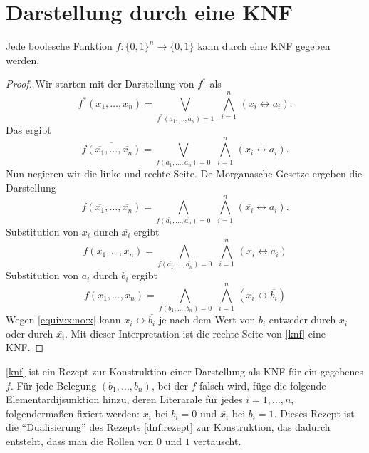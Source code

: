 \section{Darstellung durch eine KNF}

\begin{thm}
	Jede boolesche Funktion $f : \{0,1\}^n \to \{0,1\}$ kann durch eine KNF gegeben werden. 
\end{thm} 
\begin{proof}
		Wir starten mit der Darstellung von $f^\ast$ als 
		\[
			f^\ast(x_1,\ldots,x_n) = \bigvee_{f^\ast(a_1,\ldots,a_n)=1} \ \, \bigwedge_{i=1}^n \, (x_i \leftrightarrow a_i).
		\]
		Das ergibt 
		\[
			\overline{ f(\overline{x_1},\ldots,\overline{x_n})} = \bigvee_{f(\overline{a_1},\ldots,\overline{a_n}) = 0} \ \, \bigwedge_{i=1}^n  \, (x_i \leftrightarrow a_i). 
		\]
		Nun negieren wir die linke und rechte Seite. De Morganasche Gesetze ergeben die Darstellung 
		\[	
				f(\overline{x_1},\ldots,\overline{x_n}) = \bigwedge_{f(\overline{a_1},\ldots,\overline{a_n})=0} \ \, \bigwedge_{i=1}^n  \, (\overline{x_i} \leftrightarrow a_i). 
		\]
		Substitution von $x_i$ durch $\overline{x_i}$ ergibt 
		\[
				f(x_1,\ldots,x_n) = \bigwedge_{f(\overline{a_1},\ldots,\overline{a_n})=0} \ \, \bigwedge_{i=1}^n  \, (x_i \leftrightarrow a_i)
		\]
		Substitution von $a_i$ durch $\overline{b_i}$ ergibt
		\begin{equation} \label{knf} 
			f(x_1,\ldots,x_n) = \bigwedge_{f(b_1,\ldots,b_n)=0} \ \, \bigwedge_{i=1}^n  \, (x_i \leftrightarrow \overline{b_i})
		\end{equation}
		Wegen \eqref{equiv:x:no:x} kann $x_i \leftrightarrow \overline{b_i}$ je nach dem Wert von $b_i$ entweder durch $x_i$ oder durch $\overline{x_i}$. Mit dieser Interpretation ist die rechte Seite von \eqref {knf} eine KNF. 
\end{proof} 

\begin{bem}
	\eqref{knf} ist ein Rezept zur Konstruktion einer Darstellung als KNF für ein gegebenes $f$. Für jede Belegung $(b_1,\ldots,b_n)$, bei der $f$ falsch wird, füge die folgende Elementardijsunktion hinzu, deren Literarale für jedes $i=1,\ldots,n$, folgendermaßen fixiert werden: $x_i$ bei $b_i=0$ und $\overline{x_i}$ bei $b_i=1$. Dieses Rezept ist die ``Dualisierung'' des Rezepts \eqref{dnf:rezept} zur Konstruktion, das dadurch entsteht, dass man die Rollen von $0$ und $1$ vertauscht. 
\end{bem} 


